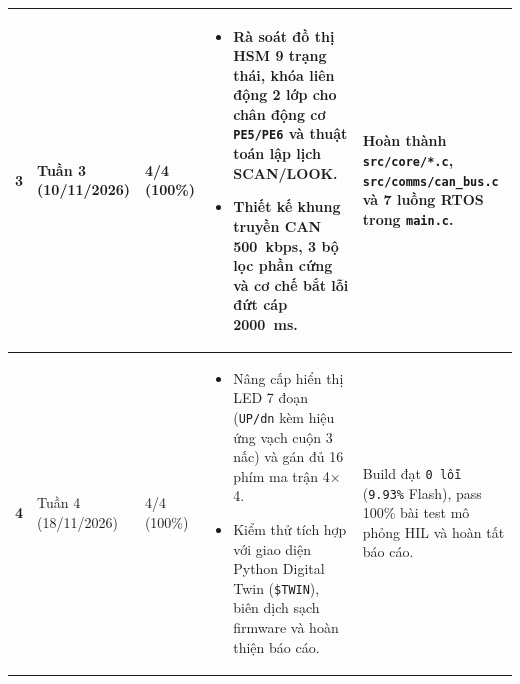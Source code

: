 \begin{xltabular}{\textwidth}{|C{0.9cm}|C{2.1cm}|C{1.6cm}|Y|L{3.5cm}|}
\textbf{3} & Tuần 3 \newline (10/11/2026) & 4/4 \newline (100\%) &
\begin{itemize}[nosep, leftmargin=1.1em, topsep=1pt, partopsep=0pt]
    \item Rà soát đồ thị HSM 9 trạng thái, khóa liên động 2 lớp cho chân động cơ \texttt{PE5/PE6} và thuật toán lập lịch SCAN/LOOK.
    \item Thiết kế khung truyền CAN 500~kbps, 3 bộ lọc phần cứng và cơ chế bắt lỗi đứt cáp 2000~ms.
\end{itemize} & Hoàn thành \texttt{src/core/*.c}, \texttt{src/comms/can\_bus.c} và 7 luồng RTOS trong \texttt{main.c}. \\
\hline
{}
\textbf{4} & Tuần 4 \newline (18/11/2026) & 4/4 \newline (100\%) &
\begin{itemize}[nosep, leftmargin=1.1em, topsep=1pt, partopsep=0pt]
    \item Nâng cấp hiển thị LED 7 đoạn (\texttt{UP/dn} kèm hiệu ứng vạch cuộn 3 nấc) và gán đủ 16 phím ma trận 4$\times$4.
    \item Kiểm thử tích hợp với giao diện Python Digital Twin (\texttt{\$TWIN}), biên dịch sạch firmware và hoàn thiện báo cáo.
\end{itemize} & Build đạt \texttt{0 lỗi} (\texttt{9.93\%} Flash), pass 100\% bài test mô phỏng HIL và hoàn tất báo cáo. \\
\end{xltabular}
\endgroup
